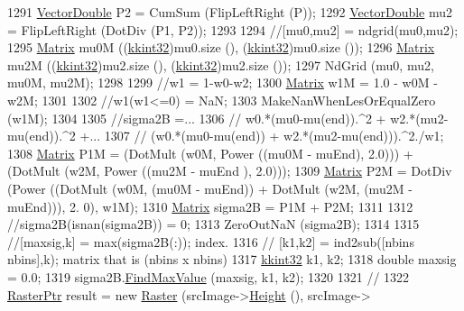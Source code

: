 \begin{DoxyCode}
{{{{1291     \hyperlink{namespace_k_k_b_a5906c207479607e5f450434095914a41}{VectorDouble}  P2 = CumSum (FlipLeftRight (P));
1292     \hyperlink{namespace_k_k_b_a5906c207479607e5f450434095914a41}{VectorDouble}  mu2 = FlipLeftRight (DotDiv (P1, P2));
1293 
1294     \textcolor{comment}{//[mu0,mu2] = ndgrid(mu0,mu2);}
1295     \hyperlink{class_k_k_b_1_1_matrix}{Matrix}  mu0M ((\hyperlink{namespace_k_k_b_a8fa4952cc84fda1de4bec1fbdd8d5b1b}{kkint32})mu0.size (), (\hyperlink{namespace_k_k_b_a8fa4952cc84fda1de4bec1fbdd8d5b1b}{kkint32})mu0.size ());
1296     \hyperlink{class_k_k_b_1_1_matrix}{Matrix}  mu2M ((\hyperlink{namespace_k_k_b_a8fa4952cc84fda1de4bec1fbdd8d5b1b}{kkint32})mu2.size (), (\hyperlink{namespace_k_k_b_a8fa4952cc84fda1de4bec1fbdd8d5b1b}{kkint32})mu2.size ());
1297     NdGrid (mu0, mu2, mu0M, mu2M);
1298     
1299     \textcolor{comment}{//w1 = 1-w0-w2;}
1300     \hyperlink{class_k_k_b_1_1_matrix}{Matrix}  w1M = 1.0 - w0M - w2M;
1301 
1302     \textcolor{comment}{//w1(w1<=0) = NaN;}
1303     MakeNanWhenLesOrEqualZero (w1M);
1304 
1305     \textcolor{comment}{//sigma2B =...}
1306     \textcolor{comment}{//    w0.*(mu0-mu(end)).^2 + w2.*(mu2-mu(end)).^2 +...}
1307     \textcolor{comment}{//    (w0.*(mu0-mu(end)) + w2.*(mu2-mu(end))).^2./w1;}
1308     \hyperlink{class_k_k_b_1_1_matrix}{Matrix}  P1M = (DotMult (w0M, Power ((mu0M - muEnd), 2.0)))  + (DotMult (w2M, Power ((mu2M - muEnd
      ), 2.0)));
1309     \hyperlink{class_k_k_b_1_1_matrix}{Matrix}  P2M = DotDiv (Power ((DotMult (w0M, (mu0M - muEnd)) +  DotMult (w2M, (mu2M - muEnd))), 2.
      0), w1M);
1310     \hyperlink{class_k_k_b_1_1_matrix}{Matrix}  sigma2B = P1M + P2M;
1311 
1312     \textcolor{comment}{//sigma2B(isnan(sigma2B)) = 0; %
1313     ZeroOutNaN (sigma2B);
1314 
1315     \textcolor{comment}{//[maxsig,k] = max(sigma2B(:));         %
       index.}
1316     \textcolor{comment}{// [k1,k2] = ind2sub([nbins nbins],k);  %
       matrix that is (nbins x nbins)}
1317     \hyperlink{namespace_k_k_b_a8fa4952cc84fda1de4bec1fbdd8d5b1b}{kkint32}  k1, k2;
1318     \textcolor{keywordtype}{double}  maxsig = 0.0;
1319     sigma2B.\hyperlink{class_k_k_b_1_1_matrix_ac4861e80e5f5f5a03bc61fd756538af5}{FindMaxValue} (maxsig, k1, k2);
1320    
1321     \textcolor{comment}{//%
1322     \hyperlink{class_k_k_b_1_1_raster}{RasterPtr}  result = \textcolor{keyword}{new} \hyperlink{class_k_k_b_1_1_raster}{Raster} (srcImage->\hyperlink{class_k_k_b_1_1_raster_af8d10d15697d5b92fb9595c48b529feb}{Height} (), srcImage->
}}}}}}
\end{DoxyCode}
